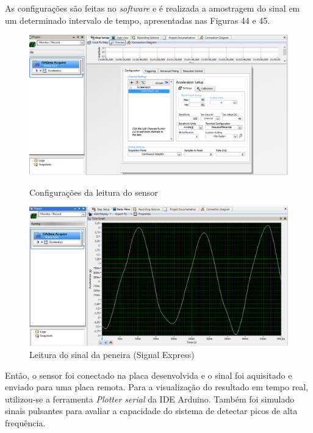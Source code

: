 \documentclass[11pt]{abntex2}
\begin{document}
				As configurações são feitas no \textit{software} e é realizada a
				amostragem do sinal em um determinado intervalo de tempo,
				apresentadas nas Figuras 44 e 45.

				\begin{figure}[!ht]
					\centering
					\begin{minipage}{0.4\linewidth}
						\centering
						\includegraphics[width = \linewidth]{../Fotos/configSignalExpress.png}
						\caption{Configurações da leitura do sensor}
					\end{minipage}
					\hfill\vline\hfill
					\begin{minipage}{0.4\linewidth}
						\centering
						\includegraphics[width = \linewidth]{../Fotos/signalExpress3g.png}
						\caption{Leitura do sinal da peneira (Signal Express)}
					\end{minipage}
				\end{figure}

				Então, o sensor foi conectado na placa desenvolvida e o sinal foi
				aquisitado e enviado para uma placa remota. Para a visualização
				do resultado em tempo real, utilizou-se a ferramenta
				\textit{Plotter serial} da IDE Arduino. Também foi simulado
				sinais pulsantes para avaliar a capacidade do sistema de
				detectar picos de alta frequência.
\end{document}

